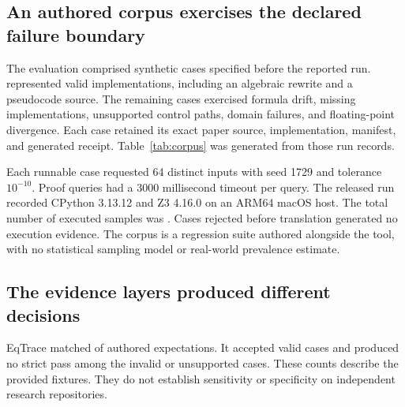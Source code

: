 \begin{table}[t]
\centering
\small

\caption{The dataset scan found a complete synthetic table and generated its field summary directly from observed records. Ranges describe this fixture and carry no inferred domain meaning.}
\label{tab:data}
\end{table}

\subsection{An authored corpus exercises the declared failure boundary}
The evaluation comprised \CorpusCases{} synthetic cases specified before the reported run. \ValidCases{} represented valid implementations, including an algebraic rewrite and a pseudocode source. The remaining cases exercised formula drift, missing implementations, unsupported control paths, domain failures, and floating-point divergence. Each case retained its exact paper source, implementation, manifest, and generated receipt. Table~\ref{tab:corpus} was generated from those run records.

Each runnable case requested 64 distinct inputs with seed 1729 and tolerance $10^{-10}$. Proof queries had a 3000 millisecond timeout per query. The released run recorded CPython 3.13.12 and Z3 4.16.0 on an ARM64 macOS host. The total number of executed samples was \ExecutedSamples{}. Cases rejected before translation generated no execution evidence. The corpus is a regression suite authored alongside the tool, with no statistical sampling model or real-world prevalence estimate.

\begin{table}[htbp]
\centering
\small

\caption{The prototype matched all authored classifications in the released synthetic corpus. Blocked cases lack accepted executable semantics; they are counted separately from demonstrated inequivalence.}
\label{tab:corpus}
\end{table}

\subsection{The evidence layers produced different decisions}
EqTrace matched \ExpectedMatches{} of \CorpusCases{} authored expectations. It accepted \ValidCases{} valid cases and produced no strict pass among the \InvalidCases{} invalid or unsupported cases. These counts describe the provided fixtures. They do not establish sensitivity or specificity on independent research repositories.

